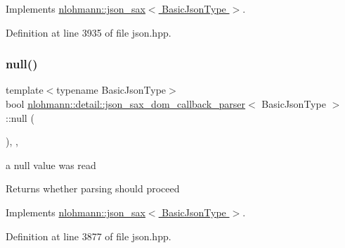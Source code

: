 Implements \hyperlink{structnlohmann_1_1json__sax_a2e0c7ecd80b18d18a8cc76f71cfc2028}{nlohmann\+::json\+\_\+sax$<$ Basic\+Json\+Type $>$}.



Definition at line 3935 of file json.\+hpp.

\mbox{\label{classnlohmann_1_1detail_1_1json__sax__dom__callback__parser_a2db7733c5d6fb6135f03f8b64811baf4}} 
\subsubsection{\texorpdfstring{null()}{null()}}
{\footnotesize\ttfamily template$<$typename Basic\+Json\+Type$>$ \\
bool \hyperlink{classnlohmann_1_1detail_1_1json__sax__dom__callback__parser}{nlohmann\+::detail\+::json\+\_\+sax\+\_\+dom\+\_\+callback\+\_\+parser}$<$ Basic\+Json\+Type $>$\+::null (\begin{DoxyParamCaption}{ }\end{DoxyParamCaption})\hspace{0.3cm}{\ttfamily [inline]}, {\ttfamily [override]}, {\ttfamily [virtual]}}



a null value was read 

\begin{DoxyReturn}{Returns}
whether parsing should proceed 
\end{DoxyReturn}


Implements \hyperlink{structnlohmann_1_1json__sax_a0ad26edef3f8d530dcec3192bba82df6}{nlohmann\+::json\+\_\+sax$<$ Basic\+Json\+Type $>$}.



Definition at line 3877 of file json.\+hpp.

\mbox{\label{classnlohmann_1_1detail_1_1json__sax__dom__callback__parser_a1025e6ef04761f4218294efaac4f34fd}} 

